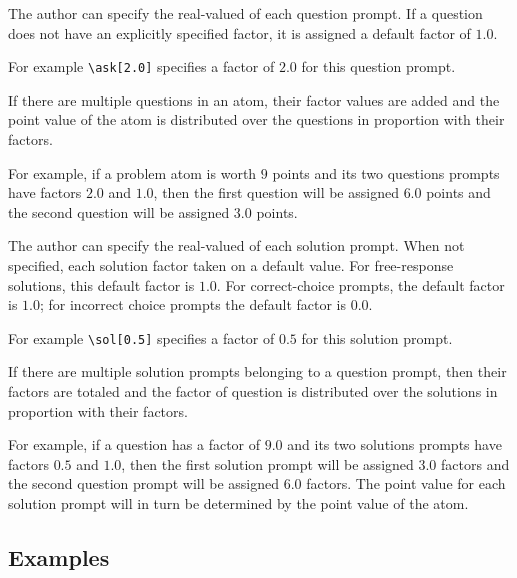 \begin{gram}
The author can specify the real-valued  of each question prompt.  
%
If a question does not have an explicitly specified factor, it is
assigned a default factor of $1.0$.

For example 
%
\lstinline`\ask[2.0]` 
%
specifies a factor of $2.0$ for this question prompt. 


If there are multiple questions in an atom, their factor values are
added and the point value of the atom is distributed over the
questions in proportion with their factors.

For example, if a problem atom is worth $9$ points and its two
questions prompts have factors $2.0$ and $1.0$, then the first
question will be assigned $6.0$ points and the second question will be
assigned $3.0$ points.


\end{gram}

\begin{gram}
The author can specify the real-valued  of each solution prompt.  
%
When not specified, each solution factor taken on a default value.
%
For free-response solutions, this default factor is $1.0$.
%
For correct-choice prompts, the default factor is $1.0$; for incorrect
choice prompts the default factor is $0.0$.

For example \lstinline`\sol[0.5]` specifies a factor of $0.5$ for this
solution prompt. 

If there are multiple solution prompts belonging to a question prompt,
then their factors are totaled and the factor of question is distributed
over the solutions in proportion with their factors.  

For example, if a question has a factor of $9.0$ and its two solutions
prompts have factors $0.5$ and $1.0$, then the first solution prompt
will be assigned $3.0$ factors and the second question prompt will be
assigned $6.0$ factors.  The point value for each solution prompt will
in turn be determined by the point value of the atom.


\end{gram}


\subsection{Examples}

